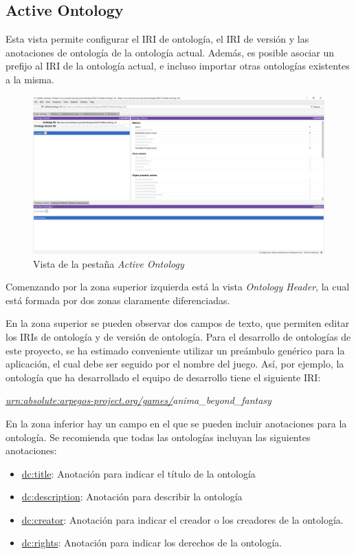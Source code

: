 \newpage
\subsection{Active Ontology}
Esta vista permite configurar el IRI de ontología, el IRI de versión y las anotaciones de ontología de la 
ontología actual. Además, es posible asociar un prefijo al IRI de la ontología actual, e incluso importar otras 
ontologías existentes a la misma.\medskip

\begin{figure}[H]
    \centering
    \includegraphics[scale=0.2]{Figures/Protege/Active_Ontology_view.png}
    \caption{Vista de la pestaña \textit{Active Ontology}}
    \label{Active_ontology_view}
\end{figure}

Comenzando por la zona superior izquierda está la vista \textit{Ontology Header}, la cual está formada 
por dos zonas claramente diferenciadas.\medskip

En la zona superior se pueden observar dos campos de texto, que permiten editar los IRIs de ontología y de versión
de ontología. Para el desarrollo de ontologías de este proyecto, se ha estimado conveniente utilizar un preámbulo genérico para 
la aplicación, el cual debe ser seguido por el nombre del juego. Así, por ejemplo, la ontología que ha desarrollado el equipo 
de desarrollo tiene el siguiente IRI: \medskip

\textit{\underline{urn:absolute:arpegos-project.org/games/}anima\_beyond\_fantasy}\medskip

En la zona inferior hay un campo en el que se pueden incluir anotaciones para la ontología. Se recomienda que todas las ontologías 
incluyan las siguientes anotaciones:

\begin{itemize}
    \item \underline{dc:title}: Anotación para indicar el título de la ontología
    \item \underline{dc:description}: Anotación para describir la ontología
    \item \underline{dc:creator}: Anotación para indicar el creador o los creadores de la ontología.
    \item \underline{dc:rights}: Anotación para indicar los derechos de la ontología.
\end{itemize}

